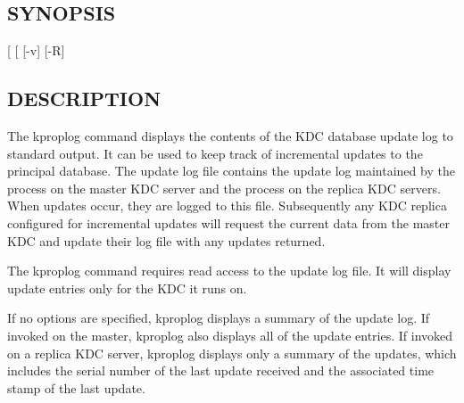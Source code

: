 \documentclass[letterpaper,10pt,english]{sphinxmanual}
\begin{document}
\subsection{SYNOPSIS}
\label{\detokenize{admin/admin_commands/kproplog:synopsis}}
 {[}\sphinxstylestrong{-h}{]} {[} \sphinxstyleemphasis{num}{]} {[}-v{]}
 {[}-R{]}


\subsection{DESCRIPTION}
\label{\detokenize{admin/admin_commands/kproplog:description}}
The kproplog command displays the contents of the KDC database update
log to standard output.  It can be used to keep track of incremental
updates to the principal database.  The update log file contains the
update log maintained by the {\hyperref[\detokenize{admin/admin_commands/kadmind:kadmind-8}]{}} process on the master
KDC server and the {\hyperref[\detokenize{admin/admin_commands/kpropd:kpropd-8}]{}} process on the replica KDC
servers.  When updates occur, they are logged to this file.
Subsequently any KDC replica configured for incremental updates will
request the current data from the master KDC and update their log file
with any updates returned.

The kproplog command requires read access to the update log file.  It
will display update entries only for the KDC it runs on.

If no options are specified, kproplog displays a summary of the update
log.  If invoked on the master, kproplog also displays all of the
update entries.  If invoked on a replica KDC server, kproplog displays
only a summary of the updates, which includes the serial number of the
last update received and the associated time stamp of the last update.
\end{document}
